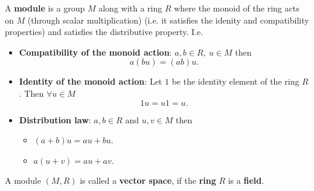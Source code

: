 \begin{definition}
	A \textbf{module} is a group $ M $ along with a ring $ R $ where the monoid of the ring acts on $ M $ (through scalar multiplication) (i.e. it satisfies the idenity and compatibility properties) and satisfies the distributive property. I.e.
	\begin{itemize}
		\item \textbf{Compatibility of the monoid action}: $ a,b \in R,\ u \in M $ then 
		\[ a(bu) = (ab)u. \]
		\item \textbf{Identity of the monoid action}: Let $ 1 $ be the identity element of the ring $ R $. Then $ \forall u \in M $
		\[1u = u1 = u. \]
		\item \textbf{Distribution law}: $ a,b \in R $ and $ u,v \in M $ then
		\begin{itemize}
			\item $ (a+b)u = au + bu $.
			\item $ a(u+v) = au + av $.
		\end{itemize}
	\end{itemize}
\end{definition}
\begin{remark}
	A module $ (M,R) $ is called a \textbf{vector space}, if the \textbf{ring} $ R $ is a \textbf{field}.
\end{remark}